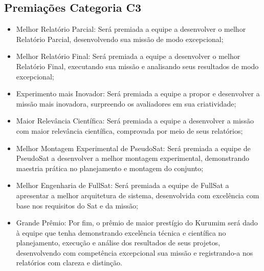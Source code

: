     
    \subsection{Premiações Categoria C3}

        \begin{itemize}
            \item Melhor Relatório Parcial: Será premiada a equipe a desenvolver o 
            melhor Relatório Parcial, desenvolvendo sua missão de modo excepcional;
            \item Melhor Relatório Final: Será premiada a equipe a desenvolver o melhor 
            Relatório Final, executando sua missão e analisando seus resultados de modo 
            excepcional;
            \item Experimento mais Inovador: Será premiada a equipe a propor e desenvolver 
            a missão mais inovadora, surpreendo os avaliadores em sua criatividade;
            \item Maior Relevância Científica: Será premiada a equipe a desenvolver a 
            missão com maior relevância científica, comprovada por meio de seus relatórios;
            \item Melhor Montagem Experimental de PseudoSat: Será premiada a equipe de 
            PseudoSat a desenvolver a melhor montagem experimental, demonstrando maestria 
            prática no planejamento e montagem do conjunto;
            \item Melhor Engenharia de FullSat: Será premiada a equipe de FullSat a 
            apresentar a melhor arquitetura de sistema, desenvolvida com excelência com 
            base nos requisitos do Sat e da missão;
            \item Grande Prêmio: Por fim, o prêmio de maior prestígio do Kurumim será 
            dado à equipe que tenha demonstrando excelência técnica e científica no 
            planejamento, execução e análise dos resultados de seus projetos, desenvolvendo
            com competência excepcional sua missão e registrando-a nos relatórios com 
            clareza e distinção. 
        \end{itemize}